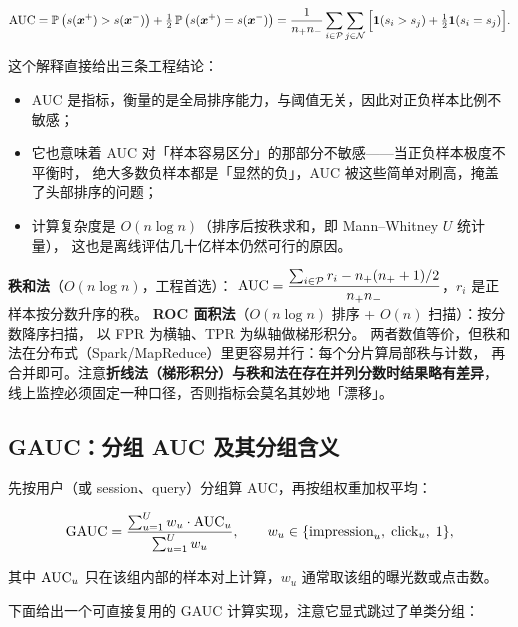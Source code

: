 \begin{equation}
\operatorname{AUC} = \operatorname{\mathbb{P}}\big(s(\bm{x}^{+}) > s(\bm{x}^{-})\big) + \tfrac{1}{2}\operatorname{\mathbb{P}}\big(s(\bm{x}^{+}) = s(\bm{x}^{-})\big)
= \frac{1}{n_+ n_-}\sum_{i \in \mathcal{P}}\sum_{j \in \mathcal{N}}
\Big[\mathbf{1}(s_i > s_j) + \tfrac{1}{2}\mathbf{1}(s_i = s_j)\Big] .
\label{eq:auc}
\end{equation}

这个解释直接给出三条工程结论：
\begin{itemize}
  \item AUC 是指标，衡量的是全局排序能力，与阈值无关，因此对正负样本比例不敏感；
  \item 它也意味着 AUC 对「样本容易区分」的那部分不敏感——当正负样本极度不平衡时，
        绝大多数负样本都是「显然的负」，AUC 被这些简单对刷高，掩盖了头部排序的问题；
  \item 计算复杂度是 $O(n\log n)$（排序后按秩求和，即 Mann--Whitney $U$ 统计量），
        这也是离线评估几十亿样本仍然可行的原因。
\end{itemize}

\begin{formulacard}
\textbf{秩和法}（$O(n\log n)$，工程首选）：
$\operatorname{AUC} = \dfrac{\sum_{i \in \mathcal{P}} r_i - n_+(n_++1)/2}{n_+ n_-}$，$r_i$ 是正样本按分数升序的秩。
\textbf{ROC 面积法}（$O(n\log n)$ 排序 + $O(n)$ 扫描）：按分数降序扫描，
以 FPR 为横轴、TPR 为纵轴做梯形积分。
两者数值等价，但秩和法在分布式（Spark/MapReduce）里更容易并行：每个分片算局部秩与计数，
再合并即可。注意\textbf{折线法（梯形积分）与秩和法在存在并列分数时结果略有差异}，
线上监控必须固定一种口径，否则指标会莫名其妙地「漂移」。
\end{formulacard}

\subsection{GAUC：分组 AUC 及其分组含义}

 先按用户（或 session、query）分组算 AUC，再按组权重加权平均：

\begin{equation}
\text{GAUC} = \frac{\sum_{u=1}^{U} w_u \cdot \operatorname{AUC}_u}{\sum_{u=1}^{U} w_u},
\qquad
w_u \in \{\text{impression}_u,\; \text{click}_u,\; 1\},
\label{eq:gauc}
\end{equation}

其中 $\operatorname{AUC}_u$ 只在该组内部的样本对上计算，$w_u$ 通常取该组的曝光数或点击数。

下面给出一个可直接复用的 GAUC 计算实现，注意它显式跳过了单类分组：

